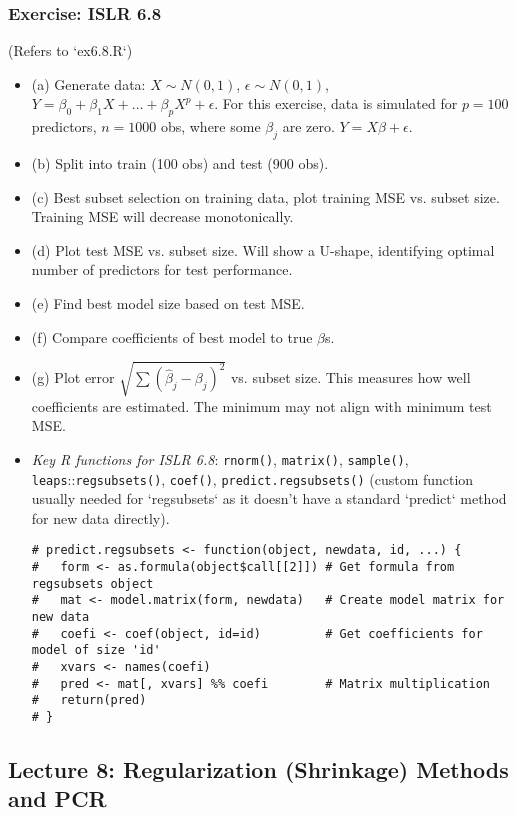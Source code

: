 \documentclass[12pt,a4paper]{article}
\newcommand{\Rpackage}[1]{\texttt{#1}} %
\newcommand{\Rfunction}[1]{\texttt{#1()}} %
\begin{document}
\begin{itemize}
\begin{itemize}
    \subsubsection{Exercise: ISLR 6.8 
    }
        (Refers to `ex6.8.R`)
        \begin{itemize}
            \item (a) Generate data: $X \sim N(0,1)$, $\epsilon \sim N(0,1)$, $Y = \beta_0 + \beta_1 X + \dots + \beta_p X^p + \epsilon$.
                For this exercise, data is simulated for $p=100$ predictors, $n=1000$ obs, where some $\beta_j$ are zero. $Y = X\beta + \epsilon$.
            \item (b) Split into train (100 obs) and test (900 obs).
            \item (c) Best subset selection on training data, plot training MSE vs. subset size. Training MSE will decrease monotonically.
            \item (d) Plot test MSE vs. subset size. Will show a U-shape, identifying optimal number of predictors for test performance.
            \item (e) Find best model size based on test MSE.
            \item (f) Compare coefficients of best model to true $\beta$s.
            \item (g) Plot error $\sqrt{\sum(\hat{\beta}_j - \beta_j)^2}$ vs. subset size. This measures how well coefficients are estimated. The minimum may not align with minimum test MSE.
            \item \textit{Key R functions for ISLR 6.8}: \Rfunction{rnorm}, \Rfunction{matrix}, \Rfunction{sample}, \Rpackage{leaps}::\Rfunction{regsubsets}, \Rfunction{coef}, \Rfunction{predict.regsubsets} (custom function usually needed for `regsubsets` as it doesn't have a standard `predict` method for new data directly).
\begin{lstlisting}[caption={Conceptual predict function for regsubsets (ISLR Ch6 Lab)}]
# predict.regsubsets <- function(object, newdata, id, ...) {
#   form <- as.formula(object$call[[2]]) # Get formula from regsubsets object
#   mat <- model.matrix(form, newdata)   # Create model matrix for new data
#   coefi <- coef(object, id=id)         # Get coefficients for model of size 'id'
#   xvars <- names(coefi)
#   pred <- mat[, xvars] %% coefi        # Matrix multiplication
#   return(pred)
# }
\end{lstlisting}
        \end{itemize}
\subsection{Lecture 8: Regularization (Shrinkage) Methods and PCR }

\end{itemize}
\end{itemize}
\end{document}
